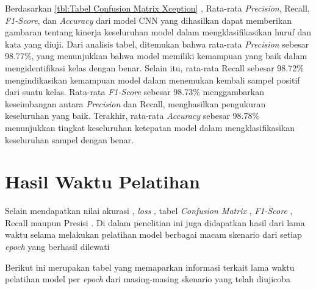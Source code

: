 Berdasarkan \ref{tbl:Tabel Confusion Matrix Xception} , Rata-rata \textit{Precision}, Recall, \textit{F1-Score}, dan \textit{Accuracy} dari model CNN yang dihasilkan dapat memberikan gambaran tentang kinerja keseluruhan model dalam mengklasifikasikan huruf dan kata yang diuji. Dari analisis tabel, ditemukan bahwa rata-rata \textit{Precision} sebesar 98.77\%, yang menunjukkan bahwa model memiliki kemampuan yang baik dalam mengidentifikasi kelas dengan benar. Selain itu, rata-rata Recall sebesar 98.72\% mengindikasikan kemampuan model dalam menemukan kembali sampel positif dari suatu kelas. Rata-rata \textit{F1-Score} sebesar 98.73\% menggambarkan keseimbangan antara \textit{Precision} dan Recall, menghasilkan pengukuran keseluruhan yang baik. Terakhir, rata-rata \textit{Accuracy} sebesar 98.78\% menunjukkan tingkat keseluruhan ketepatan model dalam mengklasifikasikan keseluruhan sampel dengan benar.


\section{Hasil Waktu Pelatihan}
Selain mendapatkan nilai akurasi , \textit{loss} , tabel \textit{Confusion Matrix} , \textit{F1-Score} , Recall maupun Presisi . Di dalam penelitian ini juga didapatkan hasil dari lama waktu selama melakukan pelatihan model berbagai macam skenario dari setiap \textit{ epoch} yang berhasil dilewati 

Berikut ini merupakan tabel yang memaparkan informasi terkait lama waktu pelatihan model per\textit{ epoch} dari masing-masing skenario yang telah diujicoba 


